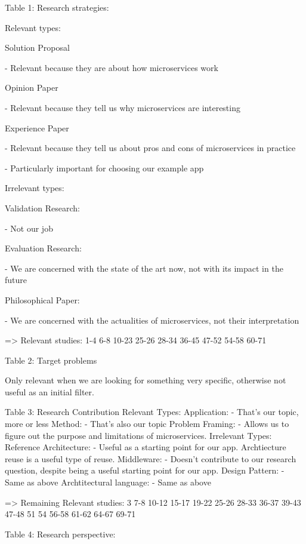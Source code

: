 \documentclass{article}
\begin{document}
Table 1: Research strategies:

Relevant types:

    Solution Proposal

     - Relevant because they are about how microservices work

    Opinion Paper

    - Relevant because they tell us why microservices are interesting

    Experience Paper

    - Relevant because they tell us about pros and cons of microservices in practice

    - Particularly important for choosing our example app

Irrelevant types:

    Validation Research:

    - Not our job

    Evaluation Research:

    - We are concerned with the state of the art now, not with its impact in the future

    Philosophical Paper:

    - We are concerned with the actualities of microservices, not their interpretation


=> Relevant studies:
    1-4
    6-8
    10-23
    25-26
    28-34
    36-45
    47-52
    54-58
    60-71

Table 2: Target problems

    Only relevant when we are looking for something very specific, otherwise not useful as an initial filter.


Table 3: Research Contribution
Relevant Types:
    Application:
        - That's our topic, more or less
    Method:
        - That's also our topic
    Problem Framing:
        - Allows us to figure out the purpose and limitations of microservices.
Irrelevant Types:
    Reference Architecture:
        - Useful as a starting point for our app. Archtiecture reuse is a useful type of reuse.
    Middleware:
        - Doesn't contribute to our research question, despite being a useful starting point for our app.
    Design Pattern:
        - Same as above
    Archtitectural language:
        - Same as above

=> Remaining Relevant studies:
    3
    7-8
    10-12
    15-17
    19-22
    25-26
    28-33
    36-37
    39-43
    47-48
    51
    54
    56-58
    61-62
    64-67
    69-71

Table 4: Research perspective:
\end{document}
